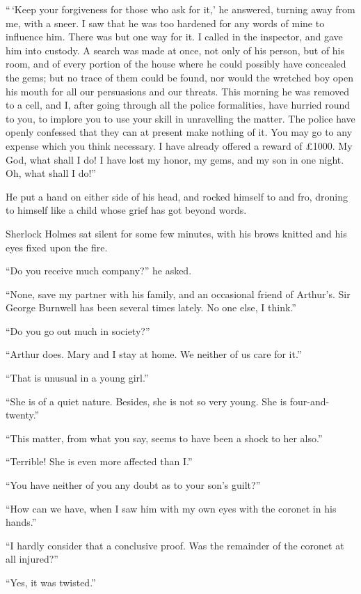“\,‘Keep your forgiveness for those who ask for it,’ he answered,
turning away from me, with a sneer. I saw that he
was too hardened for any words of mine to influence him.
There was but one way for it. I called in the inspector, and
gave him into custody. A search was made at once, not only
of his person, but of his room, and of every portion of the
house where he could possibly have concealed the gems; but
no trace of them could be found, nor would the wretched boy
open his mouth for all our persuasions and our threats. This
morning he was removed to a cell, and I, after going through
all the police formalities, have hurried round to you, to implore
you to use your skill in unravelling the matter. The
police have openly confessed that they can at present make
nothing of it. You may go to any expense which you think
necessary. I have already offered a reward of £1000. My
God, what shall I do! I have lost my honor, my gems, and
my son in one night. Oh, what shall I do!”

He put a hand on either side of his head, and rocked himself
to and fro, droning to himself like a child whose grief has
got beyond words.

Sherlock Holmes sat silent for some few minutes, with his
brows knitted and his eyes fixed upon the fire.

“Do you receive much company?” he asked.

“None, save my partner with his family, and an occasional
friend of Arthur’s. Sir George Burnwell has been several
times lately. No one else, I think.”

“Do you go out much in society?”

“Arthur does. Mary and I stay at home. We neither of
us care for it.”

“That is unusual in a young girl.”

“She is of a quiet nature. Besides, she is not so very
young. She is four-and-twenty.”

“This matter, from what you say, seems to have been a
shock to her also.”

“Terrible! She is even more affected than I.”

“You have neither of you any doubt as to your son’s
guilt?”

“How can we have, when I saw him with my own eyes
with the coronet in his hands.”

“I hardly consider that a conclusive proof. Was the remainder
of the coronet at all injured?”

“Yes, it was twisted.”

